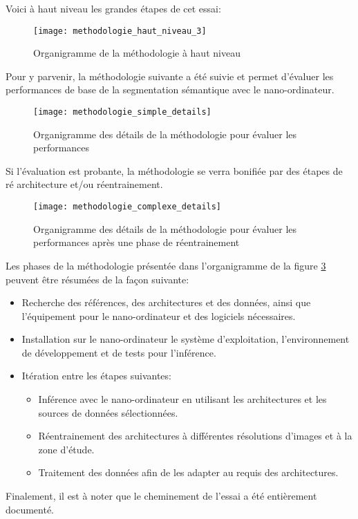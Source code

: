 ﻿\noindent Voici à haut niveau les grandes étapes de cet essai:
\label{methodologie_haut_niveau}
\begin{figure}[H]
    \centering
    \texttt{[image: methodologie\_haut\_niveau\_3]}
    \caption{Organigramme de la méthodologie à haut niveau}
    \label{fig:methodologie_haut_niveau}
\end{figure}
\noindent Pour y parvenir, la méthodologie suivante a été suivie et permet d'évaluer les performances de base de la segmentation sémantique avec le nano-ordinateur.
\label{methodologie_simple_details}
\begin{figure}[H]
    \centering
    \texttt{[image: methodologie\_simple\_details]}
    \caption{Organigramme des détails de la méthodologie pour évaluer les performances}
    \label{fig:methodologie_simple_details}
\end{figure}
\noindent Si l'évaluation est probante, la méthodologie se verra bonifiée par des étapes de ré architecture et/ou réentrainement. 
\label{methodologie_complexe_details}
\begin{figure}[H]
    \centering
    \texttt{[image: methodologie\_complexe\_details]}
    \caption{Organigramme des détails de la méthodologie pour évaluer les performances après une phase de réentrainement}
    \label{fig:methodologie_complexe_details}
\end{figure}
\noindent Les phases de la méthodologie présentée dans l'organigramme de la figure \ref{fig:methodologie_complexe_details} peuvent être résumées de la façon suivante:
\begin{itemize}
   \item Recherche des références, des architectures et des données, ainsi que l'équipement pour le nano-ordinateur et des logiciels nécessaires.
   \item Installation sur le nano-ordinateur le système d'exploitation, l'environnement de développement et de tests pour l'inférence.
   \item Itération entre les étapes suivantes:
   \begin{itemize}
      \item Inférence avec le nano-ordinateur en utilisant les architectures et les sources de données sélectionnées.
      \item Réentrainement des architectures à différentes résolutions d'images et à la zone d'étude.
      \item Traitement des données afin de les adapter au requis des architectures.
   \end{itemize}
\end{itemize}
\vspace{0.5\baselineskip}
\noindent Finalement, il est à noter que le cheminement de l'essai a été entièrement documenté.
